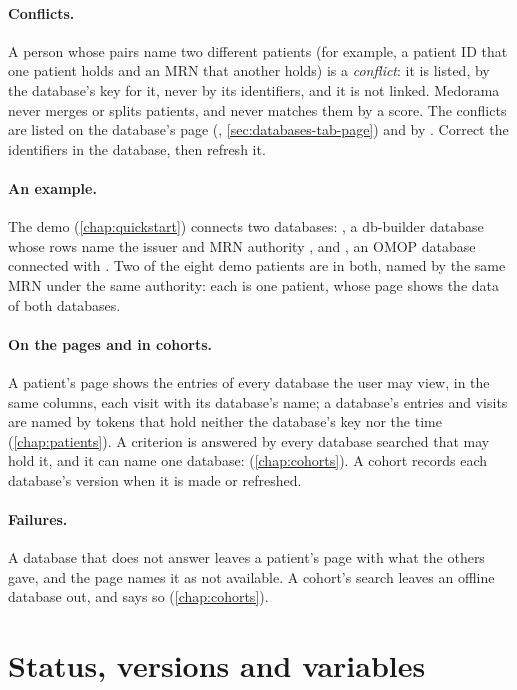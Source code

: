 \paragraph{Conflicts.} A person whose pairs name two different patients (for example, a patient
ID that one patient holds and an MRN that another holds) is a \emph{conflict}: it is listed, by
the database's key for it, never by its identifiers, and it is not linked. Medorama never merges
or splits patients, and never matches them by a score. The conflicts are listed on the database's
page (, \cref{sec:databases-tab-page}) and by
. Correct the identifiers in the database, then refresh
it.

\paragraph{An example.} The demo (\cref{chap:quickstart}) connects two databases: , a
db-builder database whose rows name the issuer and MRN authority , and
, an OMOP database connected with . Two of the eight
demo patients are in both, named by the same MRN under the same authority: each is one patient,
whose page shows the data of both databases.

\paragraph{On the pages and in cohorts.} A patient's page shows the entries of every database the
user may view, in the same columns, each visit with its database's name; a database's entries and
visits are named by tokens that hold neither the database's key nor the time
(\cref{chap:patients}). A criterion is answered by every database searched that may hold it, and
it can name one database:  (\cref{chap:cohorts}). A cohort records each
database's version when it is made or refreshed.

\paragraph{Failures.} A database that does not answer leaves a patient's page with what the
others gave, and the page names it as not available. A cohort's search leaves an offline
database out, and says so (\cref{chap:cohorts}).

\section{Status, versions and variables}
\label{sec:connecting-status}

